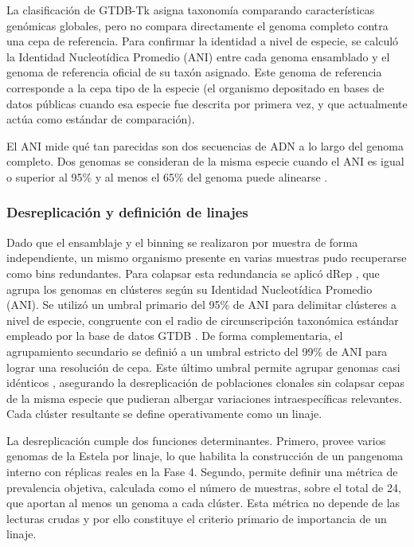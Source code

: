 La clasificación de GTDB-Tk asigna taxonomía comparando características genómicas globales, pero no compara directamente el genoma completo contra una cepa de referencia. Para confirmar la identidad a nivel de especie, se calculó la Identidad Nucleotídica Promedio (ANI) entre cada genoma ensamblado y el genoma de referencia oficial de su taxón asignado. Este genoma de referencia corresponde a la cepa tipo de la especie (el organismo depositado en bases de datos públicas cuando esa especie fue descrita por primera vez, y que actualmente actúa como estándar de comparación).

El ANI mide qué tan parecidas son dos secuencias de ADN a lo largo del genoma completo. Dos genomas se consideran de la misma especie cuando el ANI es igual o superior al 95\% y al menos el 65\% del genoma puede alinearse \cite{fastANI2018, gtdbtk2019}.

\subsubsection{Desreplicación y definición de linajes}

Dado que el ensamblaje y el binning se realizaron por muestra de forma independiente, un mismo organismo presente en varias muestras pudo recuperarse como bins redundantes. Para colapsar esta redundancia se aplicó dRep  \cite{olm2017}, que agrupa los genomas en clústeres según su Identidad Nucleotídica Promedio (ANI). Se utilizó un umbral primario del 95\% de ANI para delimitar clústeres a nivel de especie, congruente con el radio de circunscripción taxonómica estándar empleado por la base de datos GTDB \cite{gtdbtk2019}. De forma complementaria, el agrupamiento secundario se definió a un umbral estricto del 99\% de ANI para lograr una resolución de cepa. Este último umbral permite agrupar genomas casi idénticos \cite{olm2017}, asegurando la desreplicación de poblaciones clonales sin colapsar cepas de la misma especie que pudieran albergar variaciones intraespecíficas relevantes. Cada clúster resultante se define operativamente como un linaje.

La desreplicación cumple dos funciones determinantes. Primero, provee varios genomas de la Estela por linaje, lo que habilita la construcción de un pangenoma interno con réplicas reales en la Fase 4. Segundo, permite definir una métrica de prevalencia objetiva, calculada como el número de muestras, sobre el total de 24, que aportan al menos un genoma a cada clúster. Esta métrica no depende de las lecturas crudas y por ello constituye el criterio primario de importancia de un linaje.


